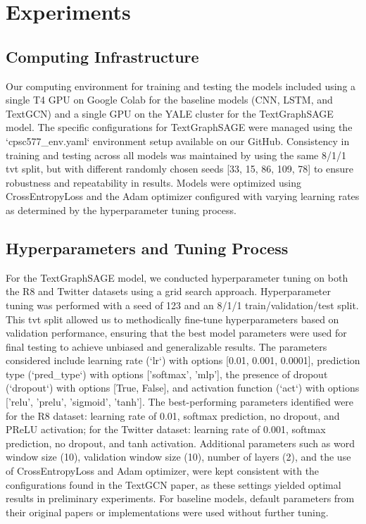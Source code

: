 \documentclass{article}
\begin{document}
\section{Experiments}
\subsection{Computing Infrastructure}

Our computing environment for training and testing the models included using a single T4 GPU on Google Colab for the baseline models (CNN, LSTM, and TextGCN) and a single GPU on the YALE cluster for the TextGraphSAGE model. The specific configurations for TextGraphSAGE were managed using the `cpsc577\_env.yaml` environment setup available on our GitHub. Consistency in training and testing across all models was maintained by using the same 8/1/1 tvt split, but with different randomly chosen seeds [33, 15, 86, 109, 78] to ensure robustness and repeatability in results. Models were optimized using CrossEntropyLoss and the Adam optimizer configured with varying learning rates as determined by the hyperparameter tuning process.

\subsection{Hyperparameters and Tuning Process}

For the TextGraphSAGE model, we conducted hyperparameter tuning on both the R8 and Twitter datasets using a grid search approach. Hyperparameter tuning was performed with a seed of 123 and an 8/1/1 train/validation/test split. This tvt split allowed us to methodically fine-tune hyperparameters based on validation performance, ensuring that the best model parameters were used for final testing to achieve unbiased and generalizable results. The parameters considered include learning rate (`lr`) with options [0.01, 0.001, 0.0001], prediction type (`pred\_type`) with options ['softmax', 'mlp'], the presence of dropout (`dropout`) with options [True, False], and activation function (`act`) with options ['relu', 'prelu', 'sigmoid', 'tanh']. The best-performing parameters identified were for the R8 dataset: learning rate of 0.01, softmax prediction, no dropout, and PReLU activation; for the Twitter dataset: learning rate of 0.001, softmax prediction, no dropout, and tanh activation. Additional parameters such as word window size (10), validation window size (10), number of layers (2), and the use of CrossEntropyLoss and Adam optimizer, were kept consistent with the configurations found in the TextGCN paper\cite{Yao2018GraphCN}, as these settings yielded optimal results in preliminary experiments. For baseline models, default parameters from their original papers\cite{Kim2014CNN, Liu2016RNN, Yao2018GraphCN} or implementations were used without further tuning.
\end{document}
